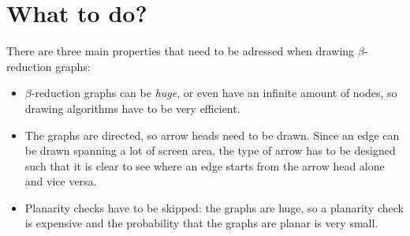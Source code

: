 
\chapter{What to do?} %

There are three main properties that need to be adressed when drawing
$\beta$-reduction graphs:
\begin{itemize}
	\item $\beta$-reduction graphs can be \emph{huge}, or even have an infinite 
	amount of nodes, so drawing algorithms have to be very efficient.
	
	\item The graphs are directed, so arrow heads need to be drawn. Since an edge
	can be drawn spanning a lot of screen area, the type of arrow has to be 
	designed such that it is clear to see where an edge starts from the arrow 
	head alone and vice versa.
	
	\item Planarity checks have to be skipped: the graphs are huge,
	so a planarity check is expensive and the probability that the graphs are planar
	is very small.
\end{itemize}




